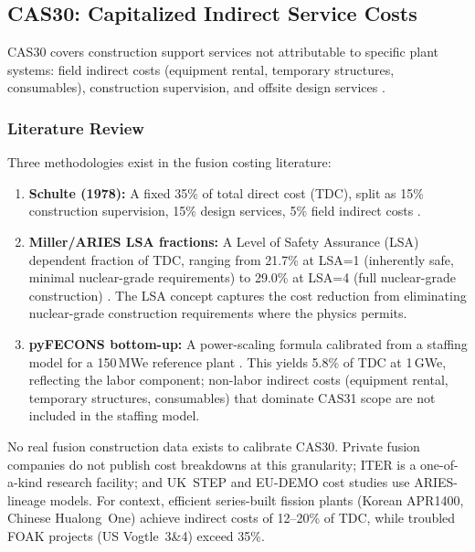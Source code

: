 \documentclass{article}
\begin{document}
\subsection{CAS30: Capitalized Indirect Service Costs}
\label{sec:cas30}

CAS30 covers construction support services not attributable to specific
plant systems: field indirect costs (equipment rental, temporary
structures, consumables), construction supervision, and offsite design
services \citep{emwg2007}.

\subsubsection{Literature Review}
Three methodologies exist in the fusion costing literature:

\begin{enumerate}
\item \textbf{Schulte (1978):} A fixed 35\% of total direct cost (TDC),
  split as 15\% construction supervision, 15\% design services,
  5\% field indirect costs \citep{schulte1978}.

\item \textbf{Miller/ARIES LSA fractions:} A Level of Safety Assurance
  (LSA) dependent fraction of TDC, ranging from 21.7\% at LSA=1
  (inherently safe, minimal nuclear-grade requirements) to 29.0\% at
  LSA=4 (full nuclear-grade construction) \citep{miller1998, piet1986,
  logan1985}. The LSA concept \citep{piet1986} captures the cost
  reduction from eliminating nuclear-grade construction requirements
  where the physics permits.

\item \textbf{pyFECONS bottom-up:} A power-scaling formula
  calibrated from a staffing model for a 150\,MWe reference plant
  \citep{woodruff2026}. This yields 5.8\% of TDC at 1\,GWe, reflecting
  the labor component; non-labor indirect costs (equipment rental,
  temporary structures, consumables) that dominate CAS31 scope are
  not included in the staffing model.
\end{enumerate}

No real fusion construction data exists to calibrate CAS30. Private
fusion companies do not publish cost breakdowns at this granularity;
ITER is a one-of-a-kind research facility; and UK~STEP and EU-DEMO
cost studies use ARIES-lineage models. For context, efficient
series-built fission plants (Korean APR1400, Chinese Hualong~One)
achieve indirect costs of 12--20\% of TDC, while troubled FOAK
projects (US Vogtle~3\&4) exceed 35\%.
\end{document}
